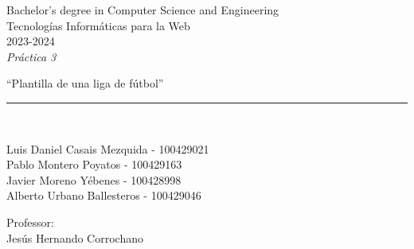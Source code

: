 \def\degree{Bachelor's degree in Computer Science and Engineering}
\def\subject{Tecnologías Informáticas para la Web}
\def\year{2023-2024}
\def\labType{Práctica 3}
\def\labName{Plantilla de una liga de fútbol}
\def\proffesor{Jesús Hernando Corrochano}

\begin{titlepage}
	\begin{sffamily}
	\color{azulUC3M}
	\begin{center}

		\begin{figure}[H]
		\end{figure}
		\vspace{1.5cm}

		\begin{Large}
			\degree\\
            \subject\\
			\year\\
			\vspace{2cm}		
			\textsl{\labType}
			\bigskip
			
		\end{Large}

		{\Huge ``\labName''}\\

		\vspace*{0.5cm}
		\rule{10.5cm}{0.1mm}\\
		\vspace*{0.9cm}
		
 		{\LARGE Luis Daniel Casais Mezquida - 100429021}\\
 		\vspace*{0.2cm}
 		{\LARGE Pablo Montero Poyatos - 100429163}\\
 		\vspace*{0.2cm}
 		{\LARGE Javier Moreno Yébenes - 100428998}\\
 		\vspace*{0.2cm}
 		{\LARGE Alberto Urbano Ballesteros - 100429046}\\
 		\vspace*{0.2cm}
		
		\vspace*{0.8cm}
		
		\begin{Large}
		    Professor:\\
			\proffesor\\
		\end{Large}

	\end{center}
	\vfill
	\end{sffamily}
\end{titlepage}